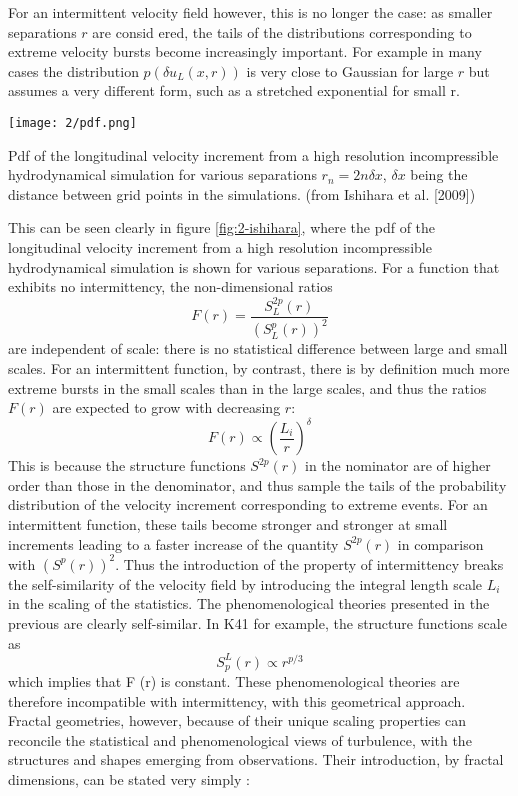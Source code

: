 For an intermittent velocity field however, this is no longer the case: as smaller separations $r$ are consid ered, the tails of the distributions corresponding to extreme velocity bursts become increasingly important. For example in many cases the distribution $p(\delta u_L(x,r))$ is very close to Gaussian for large $r$ but assumes a very different form, such as a stretched exponential for small r. 
\begin{marginfigure}[-3.5cm]
\texttt{[image: 2/pdf.png]}
\caption{Pdf of the longitudinal velocity increment from a high resolution incompressible hydrodynamical
simulation for various separations $r_n = 2 n \delta x$, $\delta x$ being the distance between grid points in the simulations. (from Ishihara et al. [2009])}
\label{fig:2-ishihara}
\end{marginfigure}This can be seen clearly in figure \ref{fig:2-ishihara}, where the pdf of the longitudinal velocity increment from a high resolution incompressible hydrodynamical simulation is shown for various separations. For a function that exhibits no intermittency, the non-dimensional ratios
\begin{equation}
    F(r)=\frac{S_L^{2p}(r)}{(S_L^p(r))^2}
\end{equation}
are independent of scale: there is no statistical difference between large and small scales. For an intermittent function, by contrast, there is by definition much more extreme bursts in the small scales than in the large scales, and thus the ratios $F(r)$ are expected to grow with decreasing $r$:
\begin{equation}
    F(r)\propto\left(\frac{L_i}{r}\right)^\delta
\end{equation}
This is because the structure functions $S^{2p}(r)$ in the nominator are of higher order than those in the denominator, and thus sample the tails of the probability distribution of the velocity increment corresponding to extreme events. For an intermittent function, these tails become stronger and stronger at small increments leading to a faster increase of the quantity $S^{2p}(r)$ in comparison with $(S^p(r))^2$. Thus the introduction of the
property of intermittency breaks the self-similarity of the velocity field by introducing the integral length scale $L_i$ in the scaling of the statistics.
The phenomenological theories presented in the previous are clearly self-similar. In K41 for example, the structure functions scale as
\begin{equation}
    S_p^L(r)\propto r^{p/3}
\end{equation}
which implies that F (r) is constant. These phenomenological theories are therefore incompatible with intermittency, with this geometrical approach. 
Fractal geometries, however, because of their unique scaling properties can reconcile the statistical and phenomenological views of turbulence, with the structures and shapes emerging from observations. Their introduction, by fractal dimensions, can be stated very simply :

